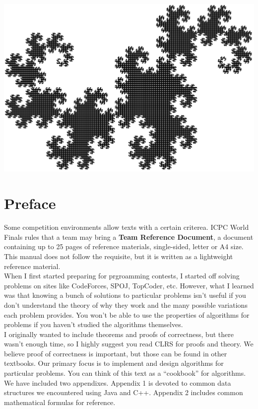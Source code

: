 \documentclass[]{book}
\author{}
\title{}
\date{}
\begin{document}
  \frontmatter
  \thispagestyle{empty}
  \begin{center}
    \includegraphics[scale=0.17]{dragon16.png}
  \end{center}
  \clearpage
  \tableofcontents
  \thispagestyle{empty}

  \chapter*{Preface}
    \indent Some competition environments allow texts with a certain criterea. ICPC World Finals
    rules that a team may bring a \textbf{Team Reference Document}, a document containing up to
    25 pages of reference materials, single-sided, letter or A4 size. This manual does not
    follow the requisite, but it is written as a lightweight reference material.\\
    \indent When I first started preparing for prgroamming contests, I started off solving
    problems on sites like CodeForces, SPOJ, TopCoder, etc. However, what I learned was
    that knowing a bunch of solutions to particular problems isn't useful if you don't understand
    the theory of why they work and the many possible variations each problem provides. You won't
    be able to use the properties of algorithms for problems if you haven't studied the algorithms
    themselves.\\
    \indent I originally wanted to include theorems and proofs of correctness, but there wasn't
    enough time, so I highly suggest you read CLRS for proofs and theory. We believe
    proof of correctness is important, but those can be found in other textbooks. Our primary focus
    is to implement and design algorithms for particular problems. You can think of this
    text as a ``cookbook'' for algorithms.\\
    \indent We have included two appendixes. Appendix 1 is devoted to common data structures we
    encountered using Java and C++. Appendix 2 includes common mathematical formulas for reference.
    \restoregeometry  %
\end{document}
